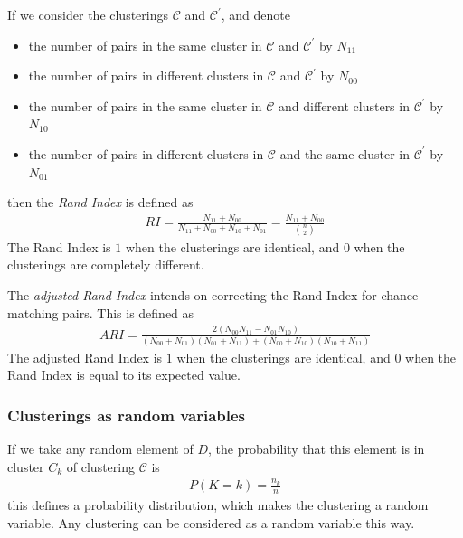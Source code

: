 \documentclass[a4paper,12pt]{article}
\theoremstyle{definition}
\begin{document}
      If we consider the clusterings $\mathcal{C}$ and $\mathcal{C}^{\prime}$, and denote
      \begin{itemize}
        \item the number of pairs in the same cluster in $\mathcal{C}$ and $\mathcal{C}^{\prime}$ by $N_{11}$
        \item the number of pairs in different clusters in $\mathcal{C}$ and $\mathcal{C}^{\prime}$ by $N_{00}$
        \item the number of pairs in the same cluster in $\mathcal{C}$ and different clusters in $\mathcal{C}^{\prime}$ by $N_{10}$
        \item the number of pairs in different clusters in $\mathcal{C}$ and the same cluster in $\mathcal{C}^{\prime}$ by $N_{01}$
      \end{itemize}
      then the \textit{Rand Index} is defined as
      \begin{align}
          RI = \frac{N_{11} + N_{00}}{N_{11} + N_{00} + N_{10} + N_{01}} = \frac{N_{11} + N_{00}}{\binom{n}{2}}
      \end{align}
      The Rand Index is $1$ when the clusterings are identical, and $0$ when the clusterings are completely different.

      The \textit{adjusted Rand Index} intends on correcting the Rand Index for chance matching pairs. This is defined as
      \begin{align}
          ARI = \frac{2\left( N_{00}N_{11} - N_{01}N_{10} \right)}{\left( N_{00} + N_{01} \right)\left( N_{01} + N_{11} \right) + \left( N_{00} + N_{10} \right)\left( N_{10} + N_{11} \right)}
      \end{align}
      The adjusted Rand Index is $1$ when the clusterings are identical, and $0$ when the Rand Index is equal to its expected value.

      \subsubsection{Clusterings as random variables}
      If we take any random element of $D$, the probability that this element is in cluster $C_k$ of clustering $\mathcal{C}$ is
      \begin{align}
          P(K=k) = \frac{n_k}{n}
      \end{align}
      this defines a probability distribution, which makes the clustering a random variable. Any clustering can be considered as a random variable this way.
\end{document}
